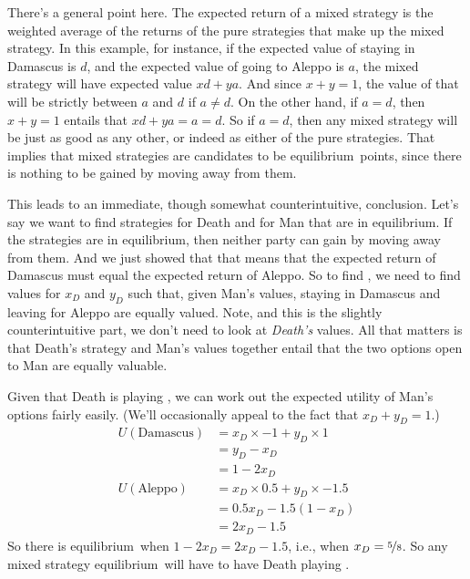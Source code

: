 There's a general point here. The expected return of a mixed strategy is the weighted average of the returns of the pure strategies that make up the mixed strategy. In this example, for instance, if the expected value of staying in Damascus is $d$, and the expected value of going to Aleppo is $a$, the mixed strategy  will have expected value $xd + ya$. And since $x + y = 1$, the value of that will be strictly between $a$ and $d$ if $a \neq d$. On the other hand, if $a = d$, then $x + y = 1$ entails that $xd + ya = a = d$. So if $a = d$, then any mixed strategy will be just as good as any other, or indeed as either of the pure strategies. That implies that mixed strategies are candidates to be equilibrium\ points, since there is nothing to be gained by moving away from them.

This leads to an immediate, though somewhat counterintuitive, conclusion. Let's say we want to find strategies  for Death and  for Man that are in equilibrium. If the strategies are in equilibrium, then neither party can gain by moving away from them. And we just showed that that means that the expected return of Damascus must equal the expected return of Aleppo. So to find , we need to find values for $x_D$ and $y_D$ such that, given Man's values, staying in Damascus and leaving for Aleppo are equally valued. Note, and this is the slightly counterintuitive part, we don't need to look at \textit{Death's} values. All that matters is that Death's strategy and Man's values together entail that the two options open to Man are equally valuable.

Given that Death is playing , we can work out the expected utility of Man's options fairly easily. (We'll occasionally appeal to the fact that $x_D + y_D = 1$.)
\begin{align*}
U(\text{Damascus}) &= x_D \times -1 + y_D \times 1 \\
&= y_D - x_D \\
&= 1 - 2x_D \\
U(\text{Aleppo}) &= x_D \times 0.5 + y_D \times -1.5 \\
&= 0.5x_D - 1.5(1 - x_D) \\
&= 2x_D - 1.5 
\end{align*}
\noindent So there is equilibrium\ when $1 - 2x_D = 2x_D - 1.5$, i.e., when $x_D = \nicefrac{5}{8}$. So any mixed strategy equilibrium\ will have to have Death playing .

